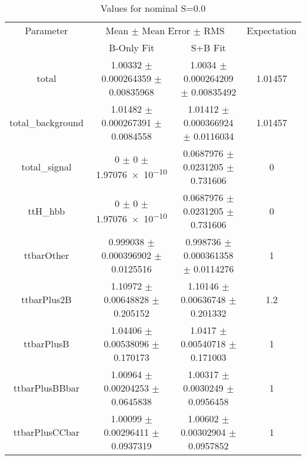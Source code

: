 \begin{table}
\centering
\caption{Values for nominal S=0.0}
\begin{tabular}{cccc}
\toprule
Parameter & \multicolumn{2}{c}{Mean $\pm$ Mean Error $\pm$ RMS} & Expectation\\
 & B-Only Fit & S+B Fit & \\
\midrule
total & \num{1.00332} $\pm$ \num{0.000264359} $\pm$ \num{0.00835968} & \num{1.0034} $\pm$ \num{0.000264209} $\pm$ \num{0.00835492} & \num{1.01457}\\
total\_background & \num{1.01482} $\pm$ \num{0.000267391} $\pm$ \num{0.0084558} & \num{1.01412} $\pm$ \num{0.000366924} $\pm$ \num{0.0116034} & \num{1.01457}\\
total\_signal & \num{0} $\pm$ \num{0} $\pm$ \num{1.97076e-10} & \num{0.0687976} $\pm$ \num{0.0231205} $\pm$ \num{0.731606} & \num{0}\\
ttH\_hbb & \num{0} $\pm$ \num{0} $\pm$ \num{1.97076e-10} & \num{0.0687976} $\pm$ \num{0.0231205} $\pm$ \num{0.731606} & \num{0}\\
ttbarOther & \num{0.999038} $\pm$ \num{0.000396902} $\pm$ \num{0.0125516} & \num{0.998736} $\pm$ \num{0.000361358} $\pm$ \num{0.0114276} & \num{1}\\
ttbarPlus2B & \num{1.10972} $\pm$ \num{0.00648828} $\pm$ \num{0.205152} & \num{1.10146} $\pm$ \num{0.00636748} $\pm$ \num{0.201332} & \num{1.2}\\
ttbarPlusB & \num{1.04406} $\pm$ \num{0.00538096} $\pm$ \num{0.170173} & \num{1.0417} $\pm$ \num{0.00540718} $\pm$ \num{0.171003} & \num{1}\\
ttbarPlusBBbar & \num{1.00964} $\pm$ \num{0.00204253} $\pm$ \num{0.0645838} & \num{1.00317} $\pm$ \num{0.0030249} $\pm$ \num{0.0956458} & \num{1}\\
ttbarPlusCCbar & \num{1.00099} $\pm$ \num{0.00296411} $\pm$ \num{0.0937319} & \num{1.00602} $\pm$ \num{0.00302904} $\pm$ \num{0.0957852} & \num{1}\\
\bottomrule
\end{tabular}
\end{table}
